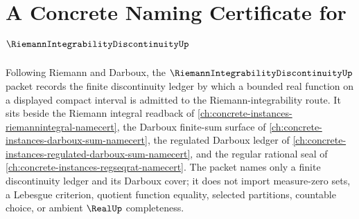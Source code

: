 \chapter{A Concrete Naming Certificate for $\RiemannIntegrabilityDiscontinuityUp$}
\label{ch:concrete-instances-riemann-integrability-discontinuity-namecert}

Following Riemann and Darboux, the $\RiemannIntegrabilityDiscontinuityUp$ packet records the finite discontinuity ledger by which a bounded real function on a displayed compact interval is admitted to the Riemann-integrability route. It sits beside the Riemann integral readback of \autoref{ch:concrete-instances-riemannintegral-namecert}, the Darboux finite-sum surface of \autoref{ch:concrete-instances-darboux-sum-namecert}, the regulated Darboux ledger of \autoref{ch:concrete-instances-regulated-darboux-sum-namecert}, and the regular rational seal of \autoref{ch:concrete-instances-regseqrat-namecert}. The packet names only a finite discontinuity ledger and its Darboux cover; it does not import measure-zero sets, a Lebesgue criterion, quotient function equality, selected partitions, countable choice, or ambient $\RealUp$ completeness.

